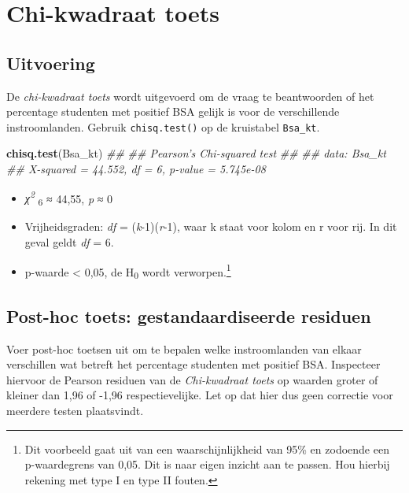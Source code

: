 \documentclass[
]{article}
\newenvironment{Shaded}{\begin{snugshade}}{\end{snugshade}}
\newcommand{\CommentTok}[1]{\textcolor[rgb]{0.56,0.35,0.01}{\textit{#1}}}
\newcommand{\KeywordTok}[1]{\textcolor[rgb]{0.13,0.29,0.53}{\textbf{#1}}}
\newcommand{\NormalTok}[1]{#1}
\providecommand{\tightlist}{%
  \setlength{\itemsep}{0pt}\setlength{\parskip}{0pt}}
\begin{document}
\hypertarget{chi-kwadraat-toets}{%
\section{Chi-kwadraat toets}\label{chi-kwadraat-toets}}

\hypertarget{uitvoering}{%
\subsection{Uitvoering}\label{uitvoering}}

De \emph{chi-kwadraat toets} wordt uitgevoerd om de vraag te
beantwoorden of het percentage studenten met positief BSA gelijk is voor
de verschillende instroomlanden. Gebruik \texttt{chisq.test()} op de
kruistabel \texttt{Bsa\_kt}.\\

\begin{Shaded}
\begin{Highlighting}[]
\KeywordTok{chisq.test}\NormalTok{(Bsa_kt)}
\CommentTok{## }
\CommentTok{##  Pearson's Chi-squared test}
\CommentTok{## }
\CommentTok{## data:  Bsa_kt}
\CommentTok{## X-squared = 44.552, df = 6, p-value = 5.745e-08}
\end{Highlighting}
\end{Shaded}

\begin{itemize}
\tightlist
\item
  \emph{χ\textsuperscript{2}} \textsubscript{6} ≈ 44,55, \emph{p} ≈ 0\\
\item
  Vrijheidsgraden: \emph{df} = (\emph{k}-1)(\emph{r}-1), waar k staat
  voor kolom en r voor rij. In dit geval geldt \emph{df} = 6.
\item
  p-waarde \textless{} 0,05, de H\textsubscript{0} wordt
  verworpen.\footnote{Dit voorbeeld gaat uit van een waarschijnlijkheid
    van 95\% en zodoende een p-waardegrens van 0,05. Dit is naar eigen
    inzicht aan te passen. Hou hierbij rekening met type I en type II
    fouten.}
\end{itemize}

\hypertarget{post-hoc-toets-gestandaardiseerde-residuen}{%
\subsection{Post-hoc toets: gestandaardiseerde
residuen}\label{post-hoc-toets-gestandaardiseerde-residuen}}

Voer post-hoc toetsen uit om te bepalen welke instroomlanden van elkaar
verschillen wat betreft het percentage studenten met positief BSA.
Inspecteer hiervoor de Pearson residuen van de \emph{Chi-kwadraat toets}
op waarden groter of kleiner dan 1,96 of -1,96 respectievelijke. Let op
dat hier dus geen correctie voor meerdere testen plaatsvindt.
\end{document}
